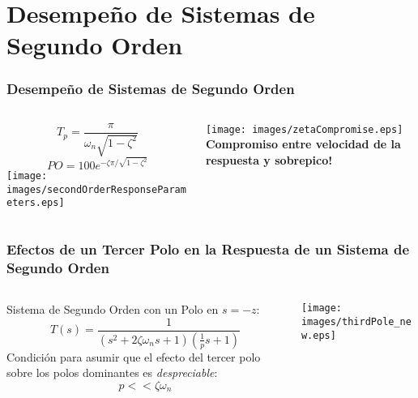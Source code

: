 \documentclass[aspectratio=169,handout]{beamer}
\theoremstyle{definition}
\theoremstyle{plain}
\theoremstyle{remark}
\begin{document}
\section{Desempeño de Sistemas de Segundo Orden}
\begin{frame}\frametitle{Desempeño de Sistemas de Segundo Orden}
\vspace*{3mm}
\begin{columns}
 \begin{column}{0.5\textwidth}
 \begin{equation*}
   T_p = \frac{\pi}{\omega_n \sqrt{1-\zeta^2}}
 \end{equation*}
 \begin{equation*}
   PO = 100 e^{-\zeta \pi/\sqrt{1-\zeta^2}}
 \end{equation*}
  \centering
  \texttt{[image: images/secondOrderResponseParameters.eps]}\\
 \end{column} 
 \pause
 \begin{column}{0.5\textwidth}
  \centering
  \texttt{[image: images/zetaCompromise.eps]}\\
  \textbf{Compromiso entre velocidad de la respuesta y sobrepico!}
 \end{column}
\end{columns} 
\end{frame}

\begin{frame}[<+->]\frametitle{Efectos de un Tercer Polo en la Respuesta de un Sistema de Segundo Orden}
\vspace*{5mm}
\begin{columns}
\begin{column}{0.5\textwidth}
Sistema de Segundo Orden con un Polo en $s=-z$:
\begin{equation*}
	T(s) = \frac{1}{(s^2+2 \zeta \omega_n s + 1)(\frac{1}{p}s + 1)}
\end{equation*}
Condición para asumir que el efecto del tercer polo sobre los polos dominantes es \textit{despreciable}:
\begin{equation*}
	p << \zeta \omega_n
\end{equation*}
\end{column}	
\begin{column}{0.5\textwidth}
\centering
\texttt{[image: images/thirdPole\_new.eps]}
\end{column}	
\end{columns}
\end{frame}
\end{document}
